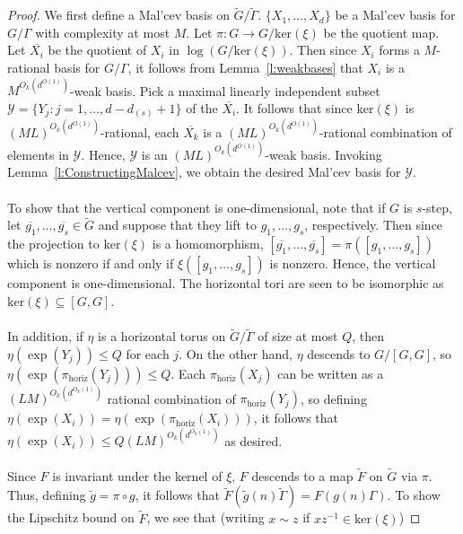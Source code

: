 \documentclass[11pt, a4paper]{amsart}
\theoremstyle{plain}
\theoremstyle{plain}
\theoremstyle{definition}
\theoremstyle{remark}
\numberwithin{equation}{section}
\numberwithin{lemma}{section}
\numberwithin{proposition}{section}
\numberwithin{corollary}{section}
\numberwithin{definition}{section}
\numberwithin{claim}{section}
\begin{document}
\begin{proof}
We first define a Mal'cev basis on $\tilde{G}/\tilde{\Gamma}$. $\{X_1, \dots, X_d\}$ be a Mal'cev basis for $G/\Gamma$ with complexity at most $M$. Let $\pi: G \to G/\mathrm{ker}(\xi)$ be the quotient map. Let $\overline{X_i}$ be the quotient of $X_i$ in $\log(G/\mathrm{ker}(\xi))$. Then since $X_i$ forms a $M$-rational basis for $G/\Gamma$, it follows from Lemma~\ref{l:weakbases} that $X_i$ is a $M^{O_k(d^{O(1)})}$-weak basis. Pick a maximal linearly independent subset $\mathcal{Y} = \{Y_j: j = 1, \dots, d - d_{(s)} + 1\}$ of the $\overline{X_i}$. It follows that since $\mathrm{ker}(\xi)$ is $(ML)^{O_k(d^{O(1)})}$-rational, each $\overline{X_k}$ is a $(ML)^{O_k(d^{O(1)})}$-rational combination of elements in $\mathcal{Y}$. Hence, $\mathcal{Y}$ is an $(ML)^{O_k(d^{O(1)})}$-weak basis. Invoking Lemma~\ref{l:ConstructingMalcev}, we obtain the desired Mal'cev basis for $\mathcal{Y}$. \\\\
To show that the vertical component is one-dimensional, note that if $G$ is $s$-step, let $\overline{g_1}, \dots, \overline{g_s} \in \tilde{G}$ and suppose that they lift to $g_1, \dots, g_s$, respectively. Then since the projection to $\mathrm{ker}(\xi)$ is a homomorphism, $[\overline{g_1}, \dots, \overline{g_s}] = \pi([g_1, \dots, g_s])$ which is nonzero if and only if $\xi([g_1, \dots, g_s])$ is nonzero. Hence, the vertical component is one-dimensional. The horizontal tori are seen to be isomorphic as $\mathrm{ker}(\xi) \subseteq [G, G]$. \\\\
In addition, if $\eta$ is a horizontal torus on $\tilde{G}/\tilde{\Gamma}$ of size at most $Q$, then $\eta(\exp(Y_j)) \le Q$ for each $j$. On the other hand, $\eta$ descends to $G/[G, G]$, so $\eta(\exp(\pi_{\mathrm{horiz}}(Y_j))) \le Q$. Each $\pi_{\mathrm{horiz}}(X_j)$ can be written as a $(LM)^{O_k(d^{O_k(1)})}$ rational combination of $\pi_{\mathrm{horiz}}(Y_j)$, so defining $\eta(\exp(X_i)) = \eta(\exp(\pi_{\mathrm{horiz}}(X_i)))$, it follows that $\eta(\exp(X_i)) \le Q(LM)^{O_k(d^{O_k(1)})}$ as desired. \\\\
Since $F$ is invariant under the kernel of $\xi$, $F$ descends to a map $\tilde{F}$ on $\tilde{G}$ via $\pi$. Thus, defining $\tilde{g} = \pi \circ g$, it follows that $\tilde{F}(\tilde{g}(n)\tilde{\Gamma}) = F(g(n)\Gamma)$. To show the Lipschitz bound on $\tilde{F}$, we see that (writing $x \sim z$ if $xz^{-1} \in \mathrm{ker}(\xi)$)

\end{proof}
\end{document}
